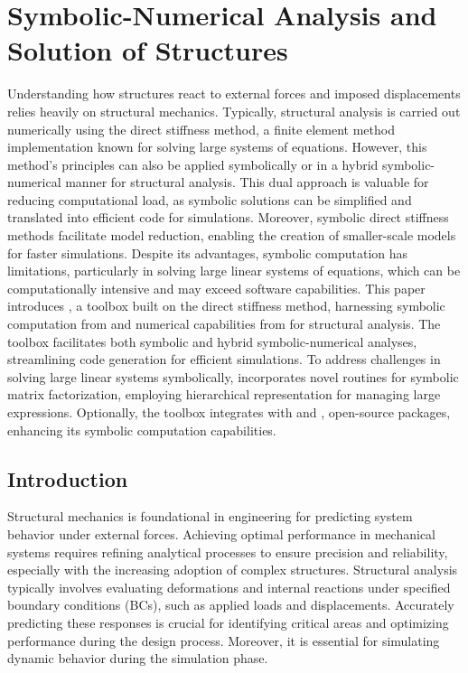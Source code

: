 
\chapter{Symbolic-Numerical Analysis and Solution of Structures}
\label{chap5:chap:symbolic_structural_analysis}

Understanding how structures react to external forces and imposed displacements relies heavily on structural mechanics. Typically, structural analysis is carried out numerically using the direct stiffness method, a finite element method implementation known for solving large systems of equations. However, this method's principles can also be applied symbolically or in a hybrid symbolic-numerical manner for structural analysis. This dual approach is valuable for reducing computational load, as symbolic solutions can be simplified and translated into efficient code for simulations. Moreover, symbolic direct stiffness methods facilitate model reduction, enabling the creation of smaller-scale models for faster simulations. Despite its advantages, symbolic computation has limitations, particularly in solving large linear systems of equations, which can be computationally intensive and may exceed software capabilities. This paper introduces \TrussMe{}, a toolbox built on the direct stiffness method, harnessing symbolic computation from \Maple{} and numerical capabilities from \Matlab{} for structural analysis. The toolbox facilitates both symbolic and hybrid symbolic-numerical analyses, streamlining code generation for efficient simulations. To address challenges in solving large linear systems symbolically, \TrussMe{} incorporates novel routines for symbolic matrix factorization, employing hierarchical representation for managing large expressions. Optionally, the toolbox integrates with \LEM{} and \LAST{}, open-source \Maple{} packages, enhancing its symbolic computation capabilities.


\section{Introduction}
\label{chap5:sec:introduction}

Structural mechanics is foundational in engineering for predicting system behavior under external forces. Achieving optimal performance in mechanical systems requires refining analytical processes to ensure precision and reliability, especially with the increasing adoption of complex structures. Structural analysis typically involves evaluating deformations and internal reactions under specified boundary conditions (\acp{BC}), such as applied loads and displacements. Accurately predicting these responses is crucial for identifying critical areas and optimizing performance during the design process. Moreover, it is essential for simulating dynamic behavior during the simulation phase.

